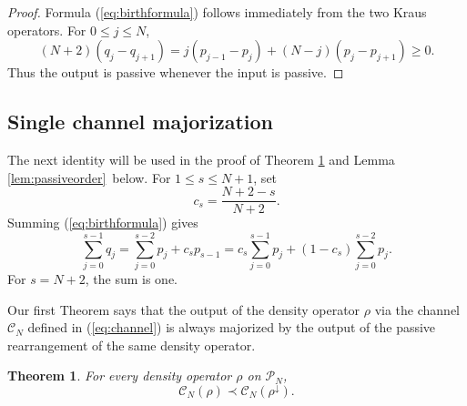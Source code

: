 \documentclass[12pt]{amsart}
\theoremstyle{plain}
\newtheorem{theorem}{Theorem}[section]
\theoremstyle{definition}
\theoremstyle{remark}
\numberwithin{equation}{section}
\newcommand{\1}{\mathbf 1}
\begin{document}
\begin{proof}
Formula (\ref{eq:birthformula}) follows immediately from the two Kraus
operators. For $0\leq j\leq N$, 
\begin{equation*}
(N+2)(q_{j}-q_{j+1})=j(p_{j-1}-p_{j})+(N-j)(p_{j}-p_{j+1})\geq 0.
\end{equation*}%
Thus the output is passive whenever the input is passive. 
\end{proof}

\subsection{Single channel majorization}

The next identity will be used in the proof of Theorem \ref{thm:onestep} and
Lemma \ref{lem:passiveorder}\ below. For $1\leq s\leq N+1$, set 
\begin{equation}
c_{s}=\frac{N+2-s}{N+2}.  \label{eq:cs}
\end{equation}%
Summing (\ref{eq:birthformula}) gives 
\begin{equation}
\sum_{j=0}^{s-1}q_{j}=\sum_{j=0}^{s-2}p_{j}+c_{s}p_{s-1}=c_{s}%
\sum_{j=0}^{s-1}p_{j}+(1-c_{s})\sum_{j=0}^{s-2}p_{j}.
\label{eq:partialpassive}
\end{equation}%
For $s=N+2$, the sum is one.

Our first Theorem says that the output of the density operator $\rho $ via
the channel $\mathcal{C}_{N}$ defined in (\ref{eq:channel}) is always
majorized by the output of the passive rearrangement of the same density
operator.

\begin{theorem}
\label{thm:onestep} For every density operator $\rho $ on $\mathcal{P}_{N}$, 
\begin{equation}
\mathcal{C}_{N}(\rho )\prec \mathcal{C}_{N}(\rho ^{\downarrow }).
\label{eq:onestepmajorization}
\end{equation}
\end{theorem}
\end{document}
